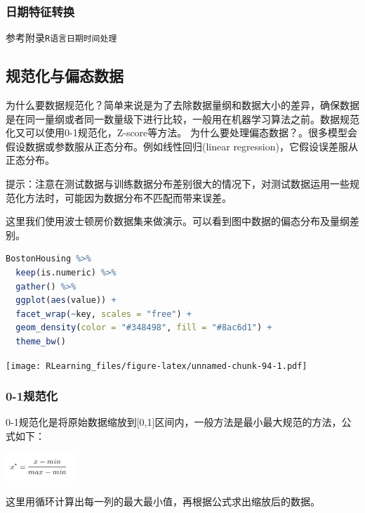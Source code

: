 \documentclass[]{ctexbook}
\newcommand{\passthrough}[1]{#1}
\begin{document}
\hypertarget{ux65e5ux671fux7279ux5f81ux8f6cux6362}{%
\subsubsection{日期特征转换}\label{ux65e5ux671fux7279ux5f81ux8f6cux6362}}

参考附录\passthrough{\lstinline!R语言日期时间处理!}

\hypertarget{ux89c4ux8303ux5316ux4e0eux504fux6001ux6570ux636e}{%
\subsection{规范化与偏态数据}\label{ux89c4ux8303ux5316ux4e0eux504fux6001ux6570ux636e}}

为什么要数据规范化？简单来说是为了去除数据量纲和数据大小的差异，确保数据是在同一量纲或者同一数量级下进行比较，一般用在机器学习算法之前。数据规范化又可以使用0-1规范化，Z-score等方法。
为什么要处理偏态数据？。很多模型会假设数据或参数服从正态分布。例如线性回归(linear regression)，它假设误差服从正态分布。

提示：注意在测试数据与训练数据分布差别很大的情况下，对测试数据运用一些规范化方法时，可能因为数据分布不匹配而带来误差。

这里我们使用波士顿房价数据集来做演示。可以看到图中数据的偏态分布及量纲差别。

\begin{lstlisting}[language=R]
BostonHousing %>%
  keep(is.numeric) %>%
  gather() %>%
  ggplot(aes(value)) +
  facet_wrap(~key, scales = "free") +
  geom_density(color = "#348498", fill = "#8ac6d1") +
  theme_bw()
\end{lstlisting}

\texttt{[image: RLearning\_files/figure-latex/unnamed-chunk-94-1.pdf]}

\hypertarget{ux89c4ux8303ux5316}{%
\subsubsection{0-1规范化}\label{ux89c4ux8303ux5316}}

0-1规范化是将原始数据缩放到{[}0,1{]}区间内，一般方法是最小最大规范的方法，公式如下：

\includegraphics[width=0.2\textwidth,height=\textheight]{./image/task02_0-1norm.png}

这里用循环计算出每一列的最大最小值，再根据公式求出缩放后的数据。
\end{document}
